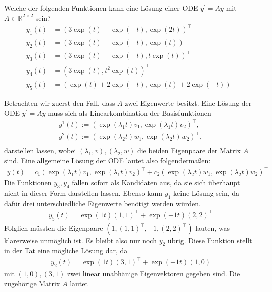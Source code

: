 \begin{exercise}
Welche der folgenden Funktionen kann eine Lösung einer ODE $y^{\prime}
= Ay$ mit $A \in \mathbb{R}^{2\times 2}$ sein?
\begin{align}
  y_1(t) &= (3\exp(t) + \exp(-t), \exp(2t))^{\top} \label{f1}\\
  y_2(t) &= (3\exp(t) + \exp(-t), \exp(t))^{\top} \label{f2}\\
  y_3(t) &= (3\exp(t) + \exp(-t), t\exp(t))^{\top} \label{f3} \\
  y_4(t) &= (3\exp(t), t^2\exp(t))^{\top} \label{f4} \\
  y_5(t) &= (\exp(t) + 2\exp(-t), \exp(t) + 2\exp(-t))^{\top} \label{f5}
\end{align}
\end{exercise}
\begin{solution}
Betrachten wir zuerst den Fall, dass $A$ zwei Eigenwerte besitzt.
Eine Lösung der ODE $y^{\prime} = Ay$ muss sich als Linearkombination
der Basisfunktionen
\begin{align*}
  y^1(t) := (\exp(\lambda_1t)v_1,\exp(\lambda_1t)v_2)^{\top}, \\
  y^2(t) := (\exp(\lambda_2t)w_1,\exp(\lambda_2t)w_2)^{\top}, \\
\end{align*}
darstellen lassen, wobei $(\lambda_1,v), (\lambda_2,w)$ die beiden Eigenpaare
der Matrix $A$ sind.
Eine allgemeine Lösung der ODE lautet also folgendermaßen:
\begin{align*}
  y(t) = c_1(\exp(\lambda_1t)v_1,\exp(\lambda_1t)v_2)^{\top} + c_2(\exp(\lambda_2t)w_1,\exp(\lambda_2t)w_2)^{\top}
\end{align*}
Die Funktionen $y_3,y_4$ fallen sofort als Kandidaten aus, da sie sich überhaupt
nicht in dieser Form darstellen lassen. Ebenso kann $y_1$ keine Lösung sein,
da dafür drei unterschiedliche Eigenwerte benötigt werden würden.
\begin{align*}
  y_5(t) = \exp(1t)(1,1)^{\top} + \exp(-1t)(2,2)^{\top}
\end{align*}
Folglich müssten die Eigenpaare $(1,(1,1)^{\top},-1,(2,2)^{\top})$ lauten, was klarerweise
unmöglich ist.
Es bleibt also nur noch $y_2$ übrig. Diese Funktion stellt in der Tat eine mögliche
Lösung dar, da
\begin{align*}
  y_2(t) = \exp(1t)(3,1)^{\top} + \exp(-1t)(1,0)
\end{align*}
mit $(1,0), (3,1)$ zwei linear unabhänige Eigenvektoren gegeben sind.
Die zugehörige Matrix $A$ lautet
\begin{align*}

\end{align*}
\end{solution}
